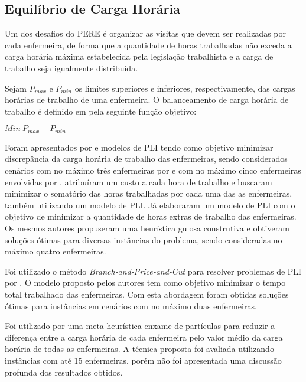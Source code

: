 \subsection{Equilíbrio de Carga Horária}

Um dos desafios do \ac{PERE} é organizar as visitas que devem ser realizadas por cada enfermeira, de forma que a quantidade de horas trabalhadas não exceda a carga horária máxima estabelecida pela legislação trabalhista e a carga de trabalho seja igualmente distribuída.

Sejam $P_{max}$ e $P_{min}$ os limites superiores e inferiores, respectivamente, das cargas horárias de trabalho de uma enfermeira. O balanceamento de carga horária de trabalho é definido em  pela seguinte função objetivo: 

\begin{center}
$Min~P_{max} - P_{min}$
\end{center}


Foram apresentados por  e   modelos de \ac{PLI} tendo como objetivo minimizar discrepância da carga horária de trabalho das enfermeiras, sendo considerados cenários com no máximo três enfermeiras por  e com no máximo cinco enfermeiras envolvidas por . 
  atribuíram um custo a cada hora de trabalho e buscaram minimizar o somatório das horas trabalhadas por cada uma das as enfermeiras, também utilizando um modelo de \ac{PLI}. 
Já  elaboraram um modelo de \ac{PLI} com o objetivo de minimizar a quantidade de horas extras de trabalho das enfermeiras. Os mesmos autores propuseram uma heurística gulosa construtiva e obtiveram soluções ótimas para diversas instâncias do problema, sendo consideradas no máximo quatro enfermeiras. 

Foi utilizado o método \textit{Branch‐and-Price‐and‐Cut} para resolver problemas de \acl{PLI} por . O modelo proposto pelos autores tem como objetivo minimizar o tempo total trabalhado das enfermeiras. Com esta abordagem foram obtidas soluções ótimas para instâncias em cenários com no máximo duas enfermeiras.  

Foi utilizado por  uma meta-heurística enxame de partículas para reduzir a diferença entre a carga horária de cada enfermeira pelo valor médio da carga horária de todas as enfermeiras. A técnica proposta foi avaliada utilizando instâncias com até 15 enfermeiras, porém não foi apresentada uma discussão profunda dos resultados obtidos. 

